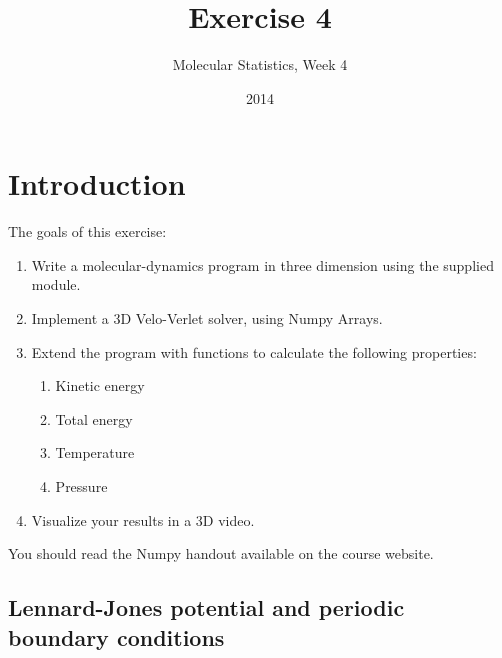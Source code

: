 \documentclass{article}
\title{Exercise 4}
\author{Molecular Statistics, Week 4}
\date{2014}
\begin{document}

\maketitle

\section{Introduction}

The goals of this exercise:
\begin{enumerate}
    \item Write a molecular-dynamics program in three dimension using the supplied module.

    \item Implement a 3D Velo-Verlet solver, using Numpy Arrays.

    \item Extend the program with functions to calculate the following properties:

    \begin{enumerate}
        \item Kinetic energy
        \item Total energy
        \item Temperature
        \item Pressure
    \end{enumerate}

    \item Visualize your results in a 3D video.

\end{enumerate}

You should read the Numpy handout available on the course website.

\subsection{Lennard-Jones potential and periodic boundary conditions}
\end{document}
